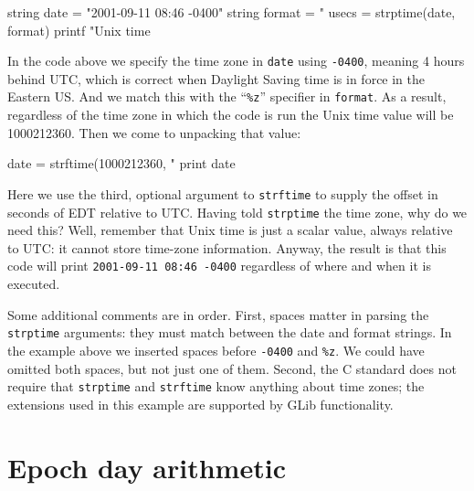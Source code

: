 \begin{script}[htbp]
  \label{ex:tzones}
\begin{scodebit}
string date = "2001-09-11 08:46 -0400"
string format = "%
usecs = strptime(date, format)
printf "Unix time %
\end{scodebit}
  In the code above we specify the time zone in \texttt{date} using
  \texttt{-0400}, meaning 4 hours behind UTC, which is correct when
  Daylight Saving time is in force in the Eastern US. And we match
  this with the ``\verb|%z|'' specifier in \texttt{format}. As a
  result, regardless of the time zone in which the code is run the
  Unix time value will be 1000212360. Then we come to unpacking that
  value:
\begin{scodebit}
date = strftime(1000212360, "%
print date
\end{scodebit}
  Here we use the third, optional argument to \texttt{strftime} to
  supply the offset in seconds of EDT relative to UTC. Having told
  \texttt{strptime} the time zone, why do we need this? Well, remember
  that Unix time is just a scalar value, always relative to UTC: it
  cannot store time-zone information. Anyway, the result is that this
  code will print \texttt{2001-09-11 08:46 -0400} regardless of where
  and when it is executed.

  \vspace{1ex} Some additional comments are in order. First, spaces
  matter in parsing the \texttt{strptime} arguments: they must match
  between the date and format strings. In the example above we
  inserted spaces before \verb|-0400| and \verb|%z|. We could have
  omitted both spaces, but not just one of them. Second, the
  \textsf{C} standard does not require that \texttt{strptime} and
  \texttt{strftime} know anything about time zones; the extensions
  used in this example are supported by \textsf{GLib} functionality.
\end{script}

\section{Epoch day arithmetic}
\label{sec:cal-arith}

